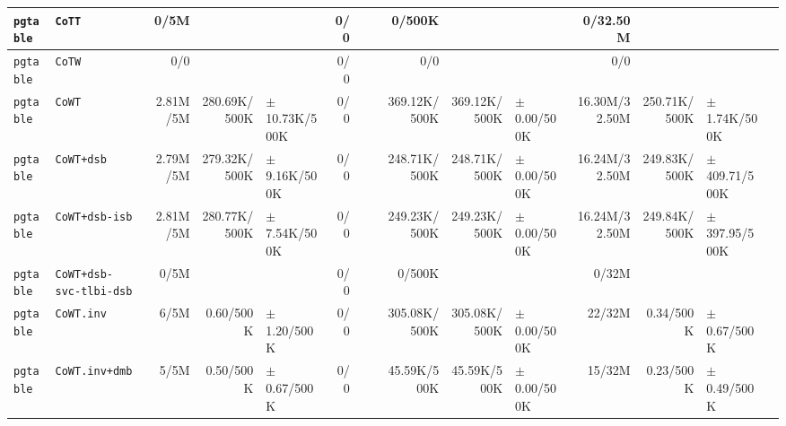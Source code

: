 \begin{tabular}{l l  | r r l | r r l | r r l | r r l l}
        \verb|pgtable| &                                                \verb|CoTT| &           0/5M &                       &                   &            0/0 &                       &  &         0/500K &                       &                   &       0/32.50M &                       &                   & \\ \hline 
        \verb|pgtable| &                                                \verb|CoTW| &            0/0 &                       &                   &            0/0 &                       &  &            0/0 &                       &                   &            0/0 &                       &                   & \\ \hline 
        \verb|pgtable| &                                                \verb|CoWT| &       2.81M/5M &          280.69K/500K & $\pm$ 10.73K/500K &            0/0 &                       &  &   369.12K/500K &          369.12K/500K &   $\pm$ 0.00/500K &  16.30M/32.50M &          250.71K/500K &  $\pm$ 1.74K/500K & \\ \hline 
        \verb|pgtable| &                                            \verb|CoWT+dsb| &       2.79M/5M &          279.32K/500K &  $\pm$ 9.16K/500K &            0/0 &                       &  &   248.71K/500K &          248.71K/500K &   $\pm$ 0.00/500K &  16.24M/32.50M &          249.83K/500K & $\pm$ 409.71/500K & \\ \hline 
        \verb|pgtable| &                                        \verb|CoWT+dsb-isb| &       2.81M/5M &          280.77K/500K &  $\pm$ 7.54K/500K &            0/0 &                       &  &   249.23K/500K &          249.23K/500K &   $\pm$ 0.00/500K &  16.24M/32.50M &          249.84K/500K & $\pm$ 397.95/500K & \\ \hline 
        \verb|pgtable| &                               \verb|CoWT+dsb-svc-tlbi-dsb| &           0/5M &                       &                   &            0/0 &                       &  &         0/500K &                       &                   &          0/32M &                       &                   & \\ \hline 
        \verb|pgtable| &                                            \verb|CoWT.inv| &           6/5M &             0.60/500K &   $\pm$ 1.20/500K &            0/0 &                       &  &   305.08K/500K &          305.08K/500K &   $\pm$ 0.00/500K &         22/32M &             0.34/500K &   $\pm$ 0.67/500K & \\ \hline 
        \verb|pgtable| &                                        \verb|CoWT.inv+dmb| &           5/5M &             0.50/500K &   $\pm$ 0.67/500K &            0/0 &                       &  &    45.59K/500K &           45.59K/500K &   $\pm$ 0.00/500K &         15/32M &             0.23/500K &   $\pm$ 0.49/500K & \\ \hline 

\end{tabular}
